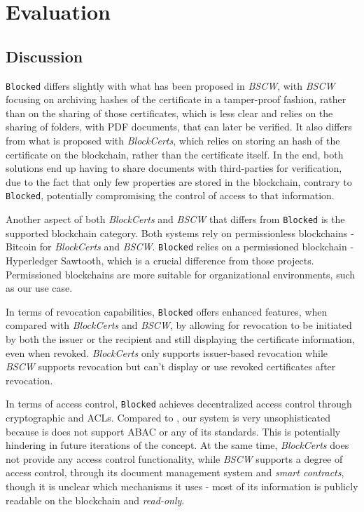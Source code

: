 \section{Evaluation}
\label{chap:evaluation}

\subsection{Discussion}
\label{sec:eval-analysis}

\texttt{Blocked} differs slightly with what has been proposed in \emph{BSCW}, with \emph{BSCW} focusing on archiving hashes of the certificate in a tamper-proof fashion, rather than on the sharing of those certificates, which is less clear and relies on the sharing of folders, with PDF documents, that can later be verified. It also differs from what is proposed with \emph{BlockCerts}, which relies on storing an hash of the certificate on the blockchain, rather than the certificate itself. In the end, both solutions end up having to share documents with third-parties for verification, due to the fact that only few properties are stored in the blockchain, contrary to \texttt{Blocked}, potentially compromising the control of access to that information.

Another aspect of both \emph{BlockCerts} and \emph{BSCW} that differs from \texttt{Blocked} is the supported blockchain category. Both systems rely on permissionless blockchains - Bitcoin for \emph{BlockCerts} and \emph{BSCW}. \texttt{Blocked} relies on a permissioned blockchain - Hyperledger Sawtooth, which is a crucial difference from those projects. Permissioned blockchains are more suitable for organizational environments, such as our use case. 

In terms of revocation capabilities, \texttt{Blocked} offers enhanced features, when compared with \emph{BlockCerts} and \emph{BSCW}, by allowing for revocation to be initiated by both the issuer or the recipient and still displaying the certificate information, even when revoked. \emph{BlockCerts} only supports issuer-based revocation while \emph{BSCW} supports revocation but can't display or use revoked certificates after revocation.

In terms of access control, \texttt{Blocked} achieves decentralized access control through cryptographic and ACLs. Compared to \cite{maesa_blockchain_2017}, our system is very unsophisticated because is does not support ABAC or any of its standards. This is potentially hindering in future iterations of the concept. At the same time, \emph{BlockCerts} does not provide any access control functionality, while \emph{BSCW} supports a degree of access control, through its document management system and \emph{smart contracts}, though it is unclear which mechanisms it uses - most of its information is publicly readable on the blockchain and \emph{read-only}.

